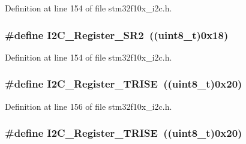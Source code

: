 Definition at line 154 of file stm32f10x\+\_\+i2c.\+h.

\subsubsection[{\texorpdfstring{I2\+C\+\_\+\+Register\+\_\+\+S\+R2}{I2C_Register_SR2}}]{\setlength{\rightskip}{0pt plus 5cm}\#define I2\+C\+\_\+\+Register\+\_\+\+S\+R2~(({\bf uint8\+\_\+t})0x18)}\hypertarget{group___i2_c__registers_ga0b5f7949e449223ec97e0169d79d007d}{}\label{group___i2_c__registers_ga0b5f7949e449223ec97e0169d79d007d}


Definition at line 154 of file stm32f10x\+\_\+i2c.\+h.

\subsubsection[{\texorpdfstring{I2\+C\+\_\+\+Register\+\_\+\+T\+R\+I\+SE}{I2C_Register_TRISE}}]{\setlength{\rightskip}{0pt plus 5cm}\#define I2\+C\+\_\+\+Register\+\_\+\+T\+R\+I\+SE~(({\bf uint8\+\_\+t})0x20)}\hypertarget{group___i2_c__registers_ga488c25a0a9f2c572af28768589fcbab2}{}\label{group___i2_c__registers_ga488c25a0a9f2c572af28768589fcbab2}


Definition at line 156 of file stm32f10x\+\_\+i2c.\+h.

\subsubsection[{\texorpdfstring{I2\+C\+\_\+\+Register\+\_\+\+T\+R\+I\+SE}{I2C_Register_TRISE}}]{\setlength{\rightskip}{0pt plus 5cm}\#define I2\+C\+\_\+\+Register\+\_\+\+T\+R\+I\+SE~(({\bf uint8\+\_\+t})0x20)}\hypertarget{group___i2_c__registers_ga488c25a0a9f2c572af28768589fcbab2}{}\label{group___i2_c__registers_ga488c25a0a9f2c572af28768589fcbab2}


